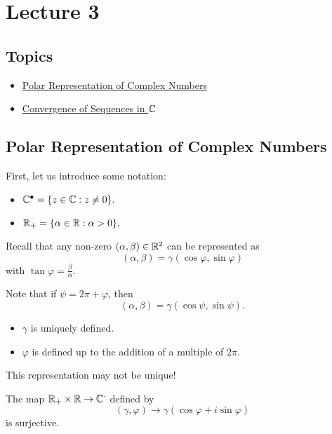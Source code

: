 \documentclass[a4paper]{report}
\begin{document}
\section{Lecture 3}

\subsection{Topics}

\begin{itemize}
    \item {\hyperref[Polar Representation of Complex Numbers]{Polar Representation of Complex Numbers}} 
    \item {\hyperref[Convergence of Sequences in the Complex Numbers]{Convergence of Sequences in \( \mathbb{C} \)}} 
\end{itemize}

\subsection{Polar Representation of Complex Numbers}\label{Polar Representation of Complex Numbers}

First, let us introduce some notation:
\begin{itemize}
    \item \( \mathbb{C}^{\bullet} = \{ z \in \mathbb{C} : z \neq 0  \}. \)
    \item \( {\mathbb{R}}_{+} = \{ \alpha \in \mathbb{R} : \alpha > 0  \}. \)
\end{itemize}

Recall that any non-zero \( (\alpha , \beta ) \in \mathbb{R}^{2} \) can be represented as 
\[  (\alpha, \beta) = \gamma (\cos \varphi, \sin \varphi) \]
with \( \tan \varphi = \frac{ \beta  }{ \alpha }\).

Note that if \( \psi = 2 \pi + \varphi  \), then
\[  (\alpha , \beta ) = \gamma (\cos \psi , \sin \psi). \]

\begin{itemize}
    \item \( \gamma  \) is uniquely defined. 
    \item \( \varphi  \) is defined up to the addition of a multiple of \( 2 \pi  \).
\end{itemize}


\begin{remark}
    This representation may not be unique!
\end{remark}

\begin{prop}
   The map \( {\mathbb{R}}_{+} \times \mathbb{R} \to \mathbb{C}^{\cdot} \) defined by  
   \[  (\gamma, \varphi) \longrightarrow \gamma (\cos \varphi + i \sin \varphi ) \]
   is surjective.
\end{prop}
\end{document}
